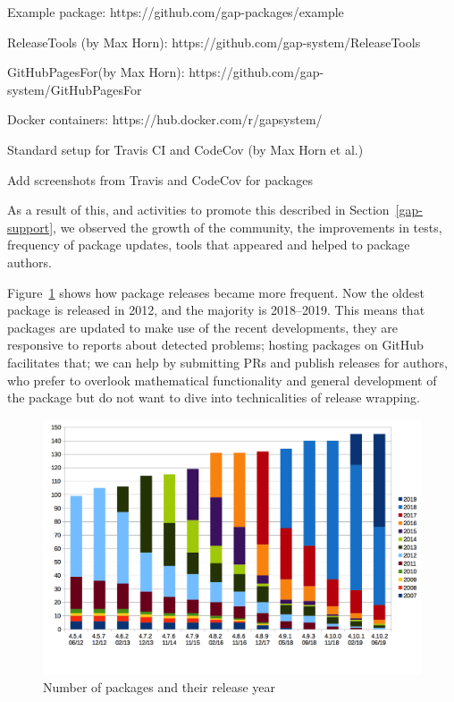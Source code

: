 \documentclass{deliverablereport}
\begin{document}
Example package: https://github.com/gap-packages/example 

ReleaseTools (by Max Horn): https://github.com/gap-system/ReleaseTools 

GitHubPagesFor\GAP (by Max Horn): https://github.com/gap-system/GitHubPagesFor\GAP 

Docker containers: https://hub.docker.com/r/gapsystem/ 

Standard setup for Travis CI and CodeCov (by Max Horn et al.)

Add screenshots from Travis and CodeCov for packages

As a result of this, and activities to promote this described in Section~\ref{gap-support},
we observed the growth of the community, the improvements in tests, frequency
of package updates, tools that appeared and helped to package authors. 

Figure~\ref{fig:gap-package-releases} shows how package releases became more frequent.
Now the oldest package is released in 2012, and the majority is 2018--2019. 
This means that packages are updated to make use of the recent \GAP developments,
they are responsive to reports about detected problems; hosting packages on GitHub
facilitates that; we can help by submitting PRs and publish releases for authors,
who prefer to overlook mathematical functionality and general development of the
package but do not want to dive into technicalities of release wrapping.

\begin{figure}[!ht]
    \centering
    \includegraphics[width=\textwidth]{images/gap-package-releases}
    \caption{Number of \GAP packages and their release year}
    \label{fig:gap-package-releases}
\end{figure}
\end{document}
